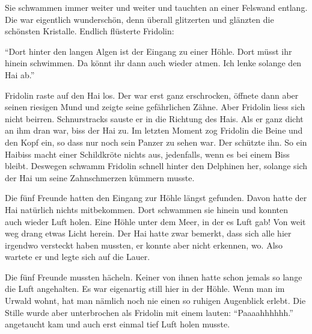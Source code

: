 Sie schwammen immer weiter und weiter und tauchten an einer Felswand entlang. Die war eigentlich wunderschön, denn überall glitzerten und glänzten die schönsten Kristalle. Endlich flüsterte Fridolin:

\enquote{Dort hinter den langen Algen ist der Eingang zu einer Höhle. Dort müsst ihr hinein schwimmen. Da könnt ihr dann auch wieder atmen. Ich lenke solange den Hai ab.}

Fridolin raste auf den Hai los. Der war erst ganz erschrocken, öffnete dann aber seinen riesigen Mund und zeigte seine gefährlichen Zähne. Aber Fridolin liess sich nicht beirren. Schnurstracks sauste er in die Richtung des Hais. Als er ganz dicht an ihm dran war, biss der Hai zu. Im letzten Moment zog Fridolin die Beine und den Kopf ein, so dass nur noch sein Panzer zu sehen war. Der schützte ihn. So ein Haibiss macht einer Schildkröte nichts aus, jedenfalls, wenn es bei einem Biss bleibt. Deswegen schwamm Fridolin schnell hinter den Delphinen her, solange sich der Hai um seine Zahnschmerzen kümmern musste.

Die fünf Freunde hatten den Eingang zur Höhle längst gefunden. Davon hatte der Hai natürlich nichts mitbekommen. Dort schwammen sie hinein und konnten auch wieder Luft holen. Eine Höhle unter dem Meer, in der es Luft gab! Von weit weg drang etwas Licht herein. Der Hai hatte zwar bemerkt, dass sich alle hier irgendwo versteckt haben mussten, er konnte aber nicht erkennen, wo. Also wartete er und legte sich auf die Lauer.

Die fünf Freunde mussten hächeln. Keiner von ihnen hatte schon jemals so lange die Luft angehalten. Es war eigenartig still hier in der Höhle. Wenn man im Urwald wohnt, hat man nämlich noch nie einen so ruhigen Augenblick erlebt. Die Stille wurde aber unterbrochen als Fridolin mit einem lauten: 
\enquote{Paaaahhhhhh.} angetaucht kam und auch erst einmal tief Luft holen musste.

